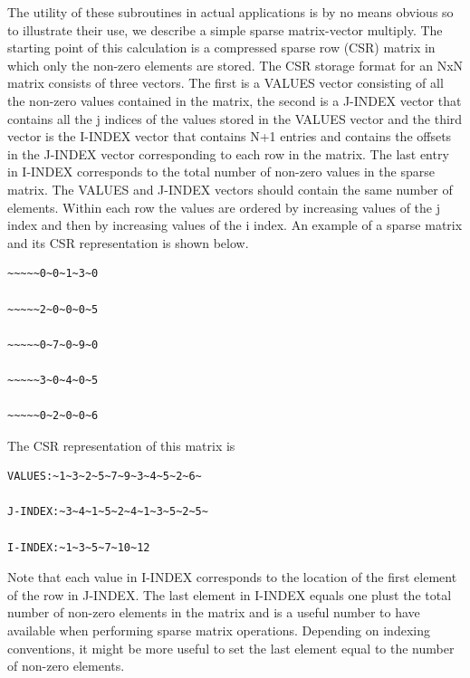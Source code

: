 The utility of these subroutines in actual applications is by no means
obvious so to illustrate their use, we describe a simple sparse matrix-vector
multiply. The starting point of this calculation is a compressed sparse
row (CSR) matrix in which only the non-zero elements are stored. The
CSR storage format for an NxN matrix consists of three vectors. The
first is a VALUES vector consisting of all the non-zero values contained
in the matrix, the second is a J-INDEX vector that contains all the
j indices of the values stored in the VALUES vector and the third
vector is the I-INDEX vector that contains N+1 entries and contains
the offsets in the J-INDEX vector corresponding to each row in the
matrix. The last entry in I-INDEX corresponds to the total number
of non-zero values in the sparse matrix. The VALUES and J-INDEX vectors
should contain the same number of elements. Within each row the values
are ordered by increasing values of the j index and then by increasing
values of the i index. An example of a sparse matrix and its CSR representation
is shown below. 
\begin{verbatim}
~~~~~0~0~1~3~0

~~~~~2~0~0~0~5

~~~~~0~7~0~9~0

~~~~~3~0~4~0~5

~~~~~0~2~0~0~6
\end{verbatim}
The CSR representation of this matrix is
\begin{verbatim}
VALUES:~1~3~2~5~7~9~3~4~5~2~6~

J-INDEX:~3~4~1~5~2~4~1~3~5~2~5~

I-INDEX:~1~3~5~7~10~12
\end{verbatim}
Note that each value in I-INDEX corresponds to the location of the
first element of the row in J-INDEX. The last element in I-INDEX equals
one plust the total number of non-zero elements in the matrix and
is a useful number to have available when performing sparse matrix
operations. Depending on indexing conventions, it might be more useful
to set the last element equal to the number of non-zero elements.

